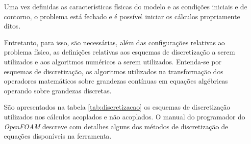 Uma vez definidas as características físicas do modelo e as condições iniciais e de contorno,
o problema está fechado e é possível iniciar os cálculos propriamente ditos.

Entretanto, para isso, são necessárias, além das configurações relativas
ao problema físico, as definições relativas aos esquemas de discretização a serem utilizados e aos
algoritmos numéricos a serem utilizados. Entenda-se por esquemas de discretização, os algoritmos
utilizados na transformação dos operadores matemáticos sobre grandezas contínuas em
equações algébricas operando sobre grandezas discretas.

São apresentados na tabela \ref{tab:discretizacao}
os esquemas de discretização utilizados nos cálculos acoplados e não acoplados. O manual
do programador do \textit{OpenFOAM} \cite[Seção 2.4]{OpenFOAM2015b} descreve com detalhes alguns
dos métodos de discretização de equações disponíveis na ferramenta.


